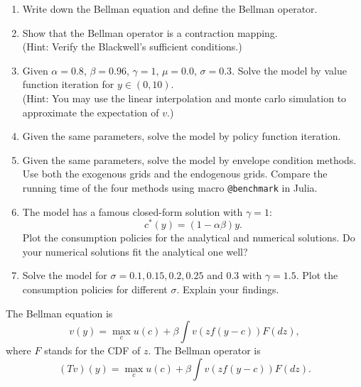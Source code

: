 \documentclass[12pt]{article}
\begin{document}
\begin{enumerate}
    \item Write down the Bellman equation and define the Bellman operator. 
    \item Show that the Bellman operator is a contraction mapping.\\
    (Hint: Verify the Blackwell's sufficient conditions.)
    \item Given $\alpha = 0.8$, $\beta = 0.96$, $\gamma = 1$, $\mu = 0.0$, $\sigma = 0.3$. 
    Solve the model by value function iteration for $y\in(0,10)$.\\
    (Hint: You may use the linear interpolation and monte carlo simulation to 
    approximate the expectation of $v$.)
    \item Given the same parameters, solve the model by policy function 
    iteration. 
    \item Given the same parameters, solve the model by envelope condition 
    methods. Use both the exogenous grids and the endogenous grids.  
    Compare the running time of the four methods using macro 
    \texttt{@benchmark} in Julia. 
    \item The model has a famous closed-form solution with $\gamma = 1$:
    \vspace{-1em}
    \begin{equation*}
        c^*(y) = (1-\alpha\beta)y.
    \end{equation*}
    Plot the consumption policies for the analytical and numerical solutions. 
    Do your numerical solutions fit the analytical one well?
    \item Solve the model for $\sigma = 0.1, 0.15, 0.2, 0.25$ and $0.3$ with 
    $\gamma = 1.5$. Plot the consumption policies for different $\sigma$. 
    Explain your findings. 
\end{enumerate}

\begin{sol}[1.1]
    The Bellman equation is 
    \vspace{-1em}
    \begin{equation*}
        v(y) = \max_{c} u(c) + \beta \int v(zf(y-c)) F(dz),
    \end{equation*}
    where $F$ stands for the CDF of $z$. The Bellman operator is
    \vspace{-0.5em} 
    \begin{equation*}
        (Tv)(y) = \max_{c} u(c) + \beta \int v(zf(y-c)) F(dz).
    \end{equation*}
    \solend
\end{sol}
\end{document}
